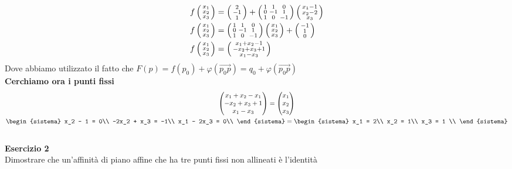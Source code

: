 \documentclass[12px]{article}
\begin{document}
\begin{align*}
	&f\left(\begin{smallmatrix}x_1\\x_2\\x_3\end{smallmatrix}\right) = \left(\begin{smallmatrix}2\\-1\\1\end{smallmatrix}\right) + \left(\begin{smallmatrix}1 & 1 & 0\\ 0 &-1&1\\1&0&-1\end{smallmatrix}\right)\left(\begin{smallmatrix}x_1-1\\x_2-2\\x_3\end{smallmatrix}\right)\\
	&f\left(\begin{smallmatrix}x_1\\x_2\\x_3\end{smallmatrix}\right) = \left(\begin{smallmatrix}1 & 1 & 0\\ 0 &-1&1\\1&0&-1\end{smallmatrix}\right)\left(\begin{smallmatrix}x_1\\x_2\\x_3\end{smallmatrix}\right) + \left(\begin{smallmatrix}-1\\1\\0\end{smallmatrix}\right)\\
	&f\left(\begin{smallmatrix}x_1\\x_2\\x_3\end{smallmatrix}\right) = \left(\begin{smallmatrix}x_1+x_2-1 \\-x_2+x_3+1\\x_1-x_3\end{smallmatrix}\right)
\end{align*}
Dove abbiamo utilizzato il fatto che $F(p) = f(p_0) + \varphi(\overrightarrow{p_0p}) = q_0 + \varphi(\overrightarrow{p_0p})$ \\
\textbf{Cerchiamo ora i punti fissi}\\
\begin{gather*}
	\matrice{x_1+ x_2- x_1 \\ -x_2+x_3+1\\x_1-x_3} = \matrice{x_1\\x_2\\x_3}\\
		\begin{sistema}
			x_2 - 1 = 0\\
			-2x_2 + x_3 = -1\\
			x_1 - 2x_3 = 0\\
		\end{sistema} =
		\begin{sistema}
			x_1 = 2\\
			x_2 = 1\\
			x_3 = 1 \\
		\end{sistema}
\end{gather*}
\hline \ \\ 
\textbf{Esercizio 2} \\
Dimostrare che un'affinità di piano affine che ha tre punti fissi non allineati è l'identità\\
\end{document}
